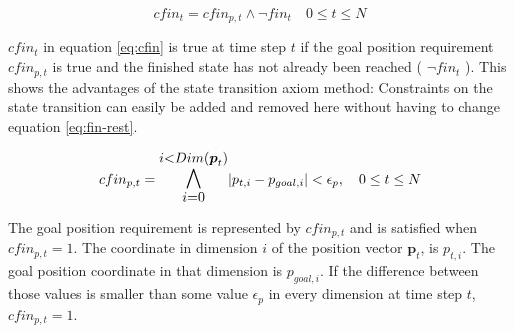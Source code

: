 \begin{equation}
\label{eq:cfin}
cfin_t =  cfin_{p,t} \wedge \neg fin_t\quad 0 \leq t \leq N
\end{equation}

 $cfin_t$ in equation \ref{eq:cfin} is true at time step $t$ if the goal position requirement $cfin_{p,t}$ is true and the finished state has not already been reached ( $ \neg fin_t$ ). This shows the advantages of the state transition axiom method: Constraints on the state transition can easily be added and removed here without having to change equation \ref{eq:fin-rest}.

\begin{equation}
\label{eq:cfin-p}
cfin_{p,t} =  \mathlarger{\mathlarger{\bigwedge_{i = 0}^{i < Dim(\boldsymbol{p}_t)}}} |p_{t,i} - p_{goal, i}| < \epsilon_{p},  \quad 0 \leq t \leq N
\end{equation}

The goal position requirement is represented by $cfin_{p,t}$ and is satisfied when $cfin_{p,t} = 1$. The coordinate in dimension $i$ of the position vector $\boldsymbol{p}_t$, is $p_{t,i}$. The goal position coordinate in that dimension is $p_{goal, i}$. If the difference between those values is smaller than some value $\epsilon_p$ in every dimension at time step $t$,  $cfin_{p,t} = 1$.

